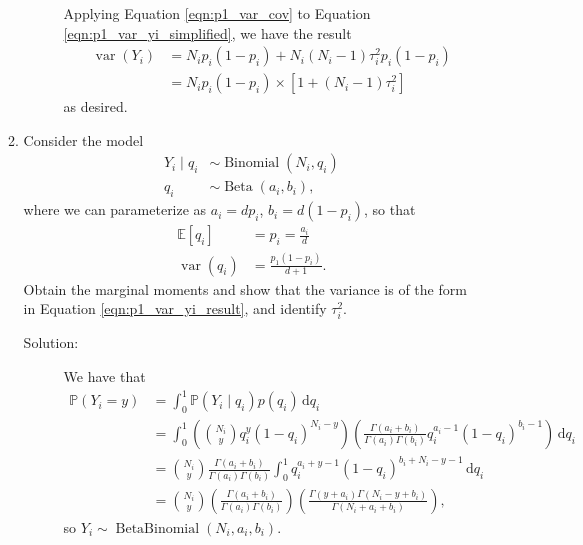 \documentclass[letterpaper,11pt]{article}
\begin{document}
\begin{enumerate}
\begin{enumerate}
\begin{description}
      Applying Equation \ref{eqn:p1_var_cov} to Equation
      \ref{eqn:p1_var_yi_simplified}, we have the result
      \begin{align*}
        \operatorname{var}\left(Y_i\right)
        &= N_ip_i\left(1-p_i\right)
          + N_i\left(N_i - 1\right) \tau_i^2p_i\left(1-p_i\right) \\
        &= N_ip_i\left(1-p_i\right) \times \left[
          1 + \left(N_i - 1\right) \tau_i^2
          \right]
      \end{align*}
      as desired.
    \end{description}
  \item Consider the model
    \begin{align}
      Y_i \mid q_i &\sim \operatorname{Binomial}\left(N_i,q_i\right) \\
      q_i &\sim \operatorname{Beta}\left(a_i,b_i\right),
            \label{eqn:p1_model}
    \end{align}
    where we can parameterize as $a_i = dp_i$, $b_i = d\left(1-p_i\right)$, so
    that
    \begin{align}
      \mathbb{E}\left[q_i\right]
      &= p_i = \frac{a_i}{d} \\
      \operatorname{var}\left(q_i\right)
      &= \frac{p_1\left(1 - p_i\right)}{d+1}.
    \end{align}
    Obtain the marginal moments and show that the variance is of the form in
    Equation \ref{eqn:p1_var_yi_result}, and identify $\tau_i^2$.

    \begin{description}
    \item[Solution:] We have that
      \begin{align}
        \mathbb{P}\left(Y_i = y\right)
        &= \int_0^1 \mathbb{P}\left(Y_i \mid q_i\right)p\left(q_i\right)
          \,\mathrm{d}q_i \nonumber\\
        &= \int_0^1 \left(
          {N_i \choose y }q_i^y \left(1 - q_i\right)^{N_i - y}
          \right)
          \left(
          \frac{\Gamma\left(a_i + b_i\right)}
          {\Gamma\left(a_i\right)\Gamma\left(b_i\right)}
          q_i^{a_i - 1}\left(1 - q_i\right)^{b_i - 1}
          \right)
          \,\mathrm{d}q_i \nonumber\\
        &= {N_i \choose y}
          \frac{\Gamma\left(a_i + b_i\right)}
          {\Gamma\left(a_i\right)\Gamma\left(b_i\right)}
          \int_0^1 
          q_i^{a_i + y - 1} \left(1 - q_i\right)^{b_i + N_i - y - 1}
          \,\mathrm{d}q_i \nonumber\\
        &= {N_i \choose y}
          \left(
          \frac{\Gamma\left(a_i + b_i\right)}
          {\Gamma\left(a_i\right)\Gamma\left(b_i\right)}
          \right)
          \left(
          \frac{\Gamma\left(y + a_i\right)\Gamma\left(
          N_i - y + b_i
          \right)}
          {\Gamma\left(N_i + a_i + b_i\right)}
          \right),
          \label{eqn:p1_beta_binomial}
      \end{align}
      so $Y_i \sim \operatorname{BetaBinomial}\left(
        N_i, a_i, b_i\right)$.


\end{description}
\end{enumerate}
\end{enumerate}
\end{document}
